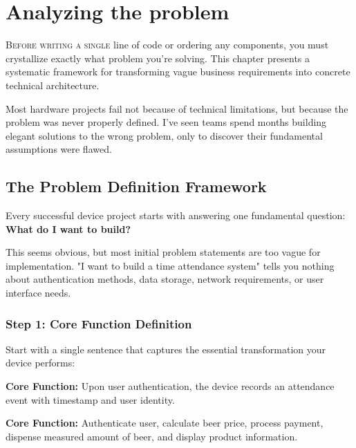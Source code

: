 \chapter{Analyzing the problem}

\lettrine{B}{efore writing a single} line of code or ordering any components, you must crystallize exactly what problem you're solving. This chapter presents a systematic framework for transforming vague business requirements into concrete technical architecture.

Most hardware projects fail not because of technical limitations, but because the problem was never properly defined. I've seen teams spend months building elegant solutions to the wrong problem, only to discover their fundamental assumptions were flawed.

\section{The Problem Definition Framework}

Every successful device project starts with answering one fundamental question: \textbf{What do I want to build?}

This seems obvious, but most initial problem statements are too vague for implementation. "I want to build a time attendance system" tells you nothing about authentication methods, data storage, network requirements, or user interface needs.

\subsection{Step 1: Core Function Definition}

Start with a single sentence that captures the essential transformation your device performs:

\begin{tcolorbox}[colback=blue!10,colframe=blue!75!black,title=Example: Time Attendance Registrator]
\textbf{Core Function:} Upon user authentication, the device records an attendance event with timestamp and user identity.
\end{tcolorbox}

\begin{tcolorbox}[colback=green!10,colframe=green!75!black,title=Example: Self-Service Beer Machine]
\textbf{Core Function:} Authenticate user, calculate beer price, process payment, dispense measured amount of beer, and display product information.
\end{tcolorbox}

